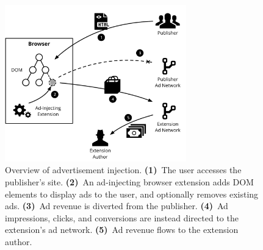 \begin{figure}[t]
    \centering
    \includegraphics[width=0.7\textwidth]{adinjection/figures/overview.pdf}
    \caption{Overview of advertisement injection.
        \textbf{(1)}~The user accesses the publisher's site.
        \textbf{(2)}~An ad-injecting browser extension adds DOM elements to display ads to the user, and optionally removes existing ads.
        \textbf{(3)}~Ad revenue is diverted from the publisher.
        \textbf{(4)}~Ad impressions, clicks, and conversions are instead directed to the extension's ad network.
        \textbf{(5)}~Ad revenue flows to the extension author.
    }
    \label{adinjection:fig:adinjection}
\end{figure}
